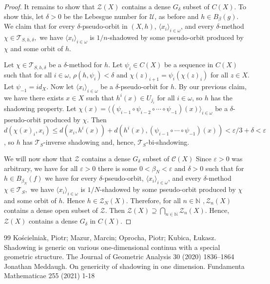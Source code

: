 \documentclass[10pt,a4paper]{amsart}
\numberwithin{equation}{section}
\begin{document}
\begin{proof}
It remains to show that $\mathcal{Z}(X) $ contains a dense $G_\delta$ subset of $C(X).$ To show this, let $\delta>0$ be the Lebesgue number for $\mathcal{U}$, as before and $h\in B_\beta(g)$. We claim that for every $\delta$-pseudo-orbit in $(X,h)$, $\langle x_i\rangle_{i\in \omega}$, and every $\delta$-method $\chi\in\mathcal{T}_{S,h,\delta}, $ we have $\langle x_i\rangle_{i\in \omega}$ is $1/n$-shadowed by some pseudo-orbit produced by $\chi$ and some orbit of $h$.

Let $\chi\in\mathcal{T}_{S,h,\delta}$ be a $\delta$-method for $h$. Let $\psi_i\in C(X)$ be a sequence in $C(X)$ such that for all $i\in \omega$, $\rho(h,\psi_i)<\delta$ and $\chi(z)_{i+1}= \psi_i(\chi(z)_i)$ for all $z\in X$. Let $\psi_{-1}=id_X.$ Now let $\langle x_i\rangle_{i\in \omega}$ be a $\delta$-pseudo-orbit for $h$. By our previous claim, we have there exists $x\in X$ such that $h^i(x) \in U_{j_i}$ for all $i\in \omega$, so $h$ has the shadowing property. Let $\chi(x) = \langle (\psi_{i-1}\circ\psi_{i-2}\circ\cdots \circ \psi_{-1})(x)\rangle_{i\in\omega} $ be a $\delta$-pseudo-orbit produced by $\chi.$ Then $d(\chi(x)_i,x_i)\leq d(x_i,h^i(x))+d(h^i(x),(\psi_{i-1}\circ\cdots \circ \psi_{-1})(x))<\varepsilon/3+\delta<\varepsilon$, so $h$ has $\mathcal{T}_S$-inverse shadowing and, hence, $\mathcal{T}_S$-bi-shadowing. 
    


    We will now show that $\mathcal{Z}$ contains a dense $G_\delta$ subset of $\mathcal C(X)$ Since $\varepsilon>0$ was arbitrary, we have for all $\varepsilon>0$ there is some $0<\beta_N<\varepsilon$ and $\delta>0$ such that for $h\in B_{\beta_N}(f)$ we have for every $\delta$-pseudo-orbit, $\langle x_i\rangle_{i\in \omega}$, and every $\delta$-method $\chi\in\mathcal{T}_{S}, $ we have $\langle x_i\rangle_{i\in \omega}$ is $1/N$-shadowed by some pseudo-orbit produced by $\chi$ and some orbit of $h$. Hence $h\in \mathcal{Z}_N(X)$. Therefore, for all $n\in \mathbb N$ $,\mathcal{Z}_n(X)$ contains a dense open subset of $\mathcal{Z}.$ Then $\mathcal{Z}(X)\supseteq \bigcap_{n\in \mathbb N}\mathcal{Z}_n(X).$ Hence, $\mathcal{Z}(X) $ contains a dense $G_\delta$ in $C(X).$
\end{proof}

\begin{thebibliography}{99}
 Ko{\'s}cielniak, Piotr; Mazur, Marcin; Oprocha, Piotr; Kubica, {\L}ukasz. Shadowing is generic on various one-dimensional continua with a special geometric structure. The Journal of Geometric Analysis 30 (2020) 1836--1864
 Jonathan Meddaugh. On genericity of shadowing in one dimension. Fundamenta Mathematicae 255 (2021) 1-18
\end{thebibliography}
\end{document}
